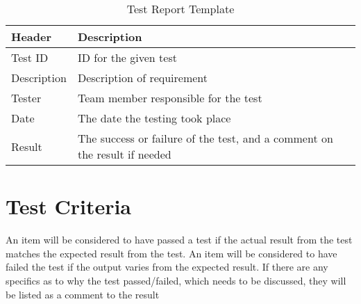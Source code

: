 \begin{table}[htbp] \footnotesize \center
\caption{Test Report Template \label{tab:testreport}}
\begin{tabularx}{\textwidth}{l l}
	\toprule
	Header & Description \\
	\midrule
	Test ID & ID for the given test \\
	Description & Description of requirement \\
	Tester & Team member responsible for the test \\
	Date & The date the testing took place \\
	Result & The success or failure of the test, and a comment on the result if needed \\
	\bottomrule
\end{tabularx}
\end{table}

\begin{table}[htbp] \footnotesize \center
	\caption{Code Coverage Report Template\label{tab:TestCoverageReport}}
	\noindent{}
\end{table}


\section{Test Criteria}
An item will be considered to have passed a test if the actual result from the test matches the expected result from the test. An item will be considered to have failed the test if the output varies from the expected result. If there are any specifics as to why the test passed/failed, which needs to be discussed, they will be listed as a comment to the result


